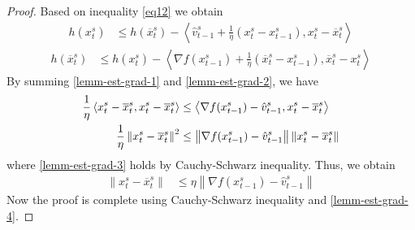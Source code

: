 \documentclass{article}
\newcommand{\norm}[1]{\left\lVert#1\right\rVert}
\newcommand{\Iprod}[2]{\left\langle #1,#2\right\rangle}
\theoremstyle{definition}
\theoremstyle{remark}
\begin{document}
\begin{proof}
Based on inequality \eqref{eq12} we obtain
\begin{align}
h(x_t^s)&\leq h(\overline{x}_t^s) - \Iprod{\hat{v}_{t-1}^s+\frac{1}{\eta}(x_t^s-x_{t-1}^s)}{x_t^s-\overline{x}_t^s}\label{lemm-est-grad-1}
\end{align}
\begin{align}
h(\overline{x}_t^s)&\leq h({x}_t^s) - \Iprod{\nabla f(x_{t-1}^s)+\frac{1}{\eta}(\overline{x}_t^s-x_{t-1}^s)}{\overline{x}_t^s-x_t^s}\label{lemm-est-grad-2}
\end{align}
By summing \eqref{lemm-est-grad-1} and \eqref{lemm-est-grad-2}, we have 
\begin{align}
\frac{1}{\eta}\Iprod{x_t^s -\overline{x}_t^s}{x_t^s -\overline{x}_t^s} &\leq \Iprod{\nabla f(x_{t-1}^s) -\hat{v}_{t-1}^s}{x_t^s -\overline{x}_t^s}\notag\\
\frac{1}{\eta}\norm{x_t^s -\overline{x}_t^s}^2 &\leq \norm{\nabla f(x_{t-1}^s) -\hat{v}_{t-1}^s}\norm{x_t^s -\overline{x}_t^s}\label{lemm-est-grad-3}
\end{align}
where \eqref{lemm-est-grad-3} holds by Cauchy-Schwarz inequality. 
Thus, we obtain
\begin{align}
\norm{x_t^s -\overline{x}_t^s} &\leq \eta\norm{\nabla f(x_{t-1}^s) -\hat{v}_{t-1}^s}\label{lemm-est-grad-4}
\end{align}
Now the proof is complete using Cauchy-Schwarz inequality and \eqref{lemm-est-grad-4}.
\end{proof}




\end{document}
